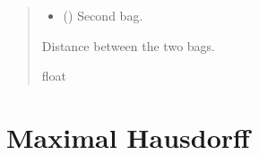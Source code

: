 \documentclass[letterpaper,10pt,english]{sphinxmanual}
\begin{document}
\begin{fulllineitems}
\begin{fulllineitems}
\begin{quote}
\begin{description}
\begin{itemize}
\item {} 
\sphinxAtStartPar
{} ({\hyperref[\detokenize{data/_autosummary/miml.data.bag.Bag:miml.data.bag.Bag}]{}}) \textendash{} Second bag.

\end{itemize}

\sphinxAtStartPar
Distance between the two bags.

\sphinxAtStartPar
float

\end{description}\end{quote}

\end{fulllineitems}


\end{fulllineitems}



\section{Maximal Hausdorff}
\label{\detokenize{core/index:maximal-hausdorff}}
\end{document}
